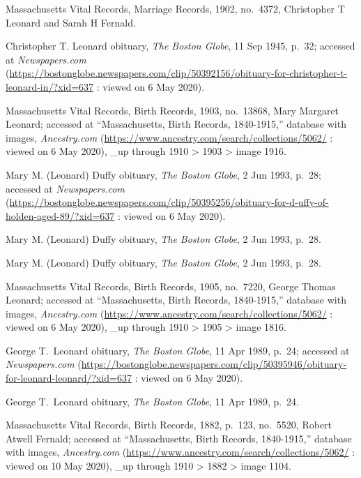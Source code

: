\begin{thebibliography}{999}
Massachusetts Vital Records, Marriage Records, 1902, no.\ 4372, Christopher T Leonard and Sarah H Fernald.

Christopher T. Leonard obituary, \textit{The Boston Globe}, 11 Sep 1945, p.\ 32; accessed at \textit{Newspapers.com} (\url{https://bostonglobe.newspapers.com/clip/50392156/obituary-for-christopher-t-leonard-in/?xid=637} : viewed on 6 May 2020).

Massachusetts Vital Records, Birth Records, 1903, no.\ 13868, Mary Margaret Leonard; accessed at ``Massachusetts, Birth Records, 1840-1915,'' database with images, \textit{Ancestry.com} (\url{https://www.ancestry.com/search/collections/5062/} : viewed on 6 May 2020), \_up through 1910 > 1903 > image 1916.

Mary M. (Leonard) Duffy obituary, \textit{The Boston Globe}, 2 Jun 1993, p.\ 28; accessed at \textit{Newspapers.com} (\url{https://bostonglobe.newspapers.com/clip/50395256/obituary-for-d-uffy-of-holden-aged-89/?xid=637} : viewed on 6 May 2020).

Mary M. (Leonard) Duffy obituary, \textit{The Boston Globe}, 2 Jun 1993, p.\ 28.

Mary M. (Leonard) Duffy obituary, \textit{The Boston Globe}, 2 Jun 1993, p.\ 28.

Massachusetts Vital Records, Birth Records, 1905, no.\ 7220, George Thomas Leonard; accessed at ``Massachusetts, Birth Records, 1840-1915,'' database with images, \textit{Ancestry.com} (\url{https://www.ancestry.com/search/collections/5062/} : viewed on 6 May 2020), \_up through 1910 > 1905 > image 1816.

George T.\ Leonard obituary, \textit{The Boston Globe}, 11 Apr 1989, p.\ 24; accessed at \textit{Newspapers.com} (\url{https://bostonglobe.newspapers.com/clip/50395946/obituary-for-leonard-leonard/?xid=637} : viewed on 6 May 2020).

George T.\ Leonard obituary, \textit{The Boston Globe}, 11 Apr 1989, p.\ 24.


Massachusetts Vital Records, Birth Records, 1882, p.\ 123, no.\ 5520, Robert Atwell Fernald; accessed at ``Massachusetts, Birth Records, 1840-1915,'' database with images, \textit{Ancestry.com} (\url{https://www.ancestry.com/search/collections/5062/} : viewed on 10 May 2020), \_up through 1910 > 1882 > image 1104.


\end{thebibliography}
